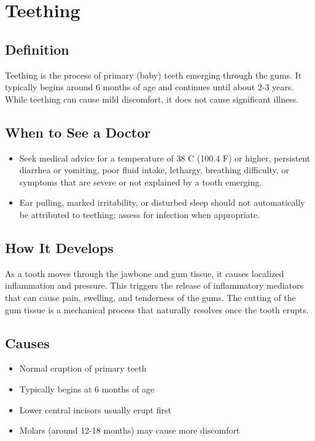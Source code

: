 \chapter{Teething}

\section*{Definition}
Teething is the process of primary (baby) teeth emerging through the gums. It typically begins around 6 months of age and continues until about 2-3 years. While teething can cause mild discomfort, it does not cause significant illness.

\section*{When to See a Doctor}
\begin{itemize}
\item Seek medical advice for a temperature of 38 C (100.4 F) or higher, persistent diarrhea or vomiting, poor fluid intake, lethargy, breathing difficulty, or symptoms that are severe or not explained by a tooth emerging.
\item Ear pulling, marked irritability, or disturbed sleep should not automatically be attributed to teething; assess for infection when appropriate.
\end{itemize}

\section*{How It Develops}
As a tooth moves through the jawbone and gum tissue, it causes localized inflammation and pressure. This triggers the release of inflammatory mediators that can cause pain, swelling, and tenderness of the gums. The cutting of the gum tissue is a mechanical process that naturally resolves once the tooth erupts.

\section*{Causes}
\begin{itemize}
\item Normal eruption of primary teeth
\item Typically begins at 6 months of age
\item Lower central incisors usually erupt first
\item Molars (around 12-18 months) may cause more discomfort
\end{itemize}


